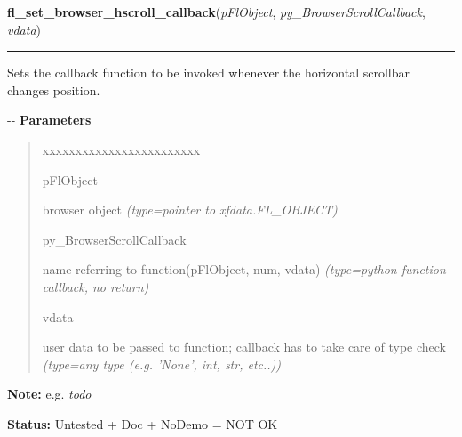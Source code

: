 \hspace{.8\funcindent}\begin{boxedminipage}{\funcwidth}

    \raggedright \textbf{fl\_set\_browser\_hscroll\_callback}(\textit{pFlObject}, \textit{py\_BrowserScrollCallback}, \textit{vdata})

    \vspace{-1.5ex}

    \rule{\textwidth}{0.5\fboxrule}
\setlength{\parskip}{2ex}

Sets the callback function to be invoked whenever the horizontal
scrollbar changes position.

-{}-
\setlength{\parskip}{1ex}
      \textbf{Parameters}
      \vspace{-1ex}

      \begin{quote}
        \begin{Ventry}{xxxxxxxxxxxxxxxxxxxxxxxx}

          \item[pFlObject]


browser object
            {\it (type=pointer to xfdata.FL\_OBJECT)}

          \item[py\_BrowserScrollCallback]


name referring to function(pFlObject, num, vdata)
            {\it (type=python function callback, no return)}

          \item[vdata]


user data to be passed to function; callback has to take care of
type check
            {\it (type=any type (e.g. 'None', int, str, etc..))}

        \end{Ventry}

      \end{quote}

\textbf{Note:} 
e.g. \emph{todo}


\textbf{Status:} 
Untested + Doc + NoDemo = NOT OK


    \end{boxedminipage}

    \label{xformslib:flbrowser:fl_set_browser_vscroll_callback}

    \vspace{0.5ex}

